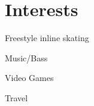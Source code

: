 \documentclass[10pt]{article} %
\begin{document}

\section{Interests}

\begin{itemize}[leftmargin=10mm]
\begin{minipage}{0.5\linewidth}
    \item Freestyle inline skating
    \item Music/Bass
\end{minipage}
\begin{minipage}{0.5\linewidth}
    \item Video Games
    \item Travel
\end{minipage}
\end{itemize}
\end{document}
